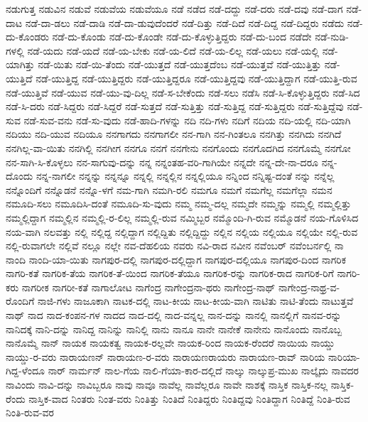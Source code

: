 {ನಡುಗುತ್ತ
ನಡುವಿನ
ನಡುವೆ
ನಡುವೆಯ
ನಡುವೆಯೂ
ನಡೆ
ನಡೆದ
ನಡೆ-ದದ್ದು
ನಡೆ-ದರು
ನಡೆ-ದವು
ನಡೆ-ದಾಗ
ನಡೆ-ದಾಟ
ನಡೆ-ದಾ-ಡಲು
ನಡೆ-ದಾಡಿ
ನಡೆ-ದಾ-ಡುವುದೆಂದರೆ
ನಡೆ-ದಿತ್ತು
ನಡೆ-ದಿದೆ
ನಡೆ-ದಿದ್ದ
ನಡೆ-ದಿದ್ದರು
ನಡೆದು
ನಡೆ-ದು-ಕೊಂಡರು
ನಡೆ-ದು-ಕೊಂಡು
ನಡೆ-ದು-ಕೊಂಡೇ
ನಡೆ-ದು-ಕೊಳ್ಳುತ್ತಿದ್ದರು
ನಡೆ-ದು-ಬಂದ
ನಡೆದೇ
ನಡೆ-ನುಡಿ-ಗಳಲ್ಲಿ
ನಡೆ-ಯದು
ನಡೆ-ಯದೆ
ನಡೆ-ಯ-ಬೇಕು
ನಡೆ-ಯ-ಲಿದೆ
ನಡೆ-ಯ-ಲಿಲ್ಲ
ನಡೆ-ಯಲು
ನಡೆ-ಯಲ್ಲಿ
ನಡೆ-ಯಾಗಿತ್ತು
ನಡೆ-ಯಿತು
ನಡೆ-ಯಿ-ತೆಂದು
ನಡೆ-ಯುತ್ತದೆ
ನಡೆ-ಯುತ್ತದೆಂಬ
ನಡೆ-ಯುತ್ತವೆ
ನಡೆ-ಯುತ್ತಿತ್ತು
ನಡೆ-ಯುತ್ತಿದೆ
ನಡೆ-ಯುತ್ತಿದ್ದ
ನಡೆ-ಯುತ್ತಿದ್ದರು
ನಡೆ-ಯುತ್ತಿದ್ದರೂ
ನಡೆ-ಯುತ್ತಿದ್ದವು
ನಡೆ-ಯುತ್ತಿದ್ದಾಗ
ನಡೆ-ಯುತ್ತಿ-ರುವ
ನಡೆ-ಯುತ್ತಿವೆ
ನಡೆ-ಯುವ
ನಡೆ-ಯು-ವು-ದಿಲ್ಲ
ನಡೆ-ಸ-ಬೇಕೆಂದು
ನಡೆ-ಸಲು
ನಡೆಸಿ
ನಡೆ-ಸಿ-ಕೊಳ್ಳುತ್ತಿದ್ದರು
ನಡೆ-ಸಿದ
ನಡೆ-ಸಿ-ದರು
ನಡೆ-ಸಿದ್ದರು
ನಡೆ-ಸಿದ್ದರೆ
ನಡೆ-ಸುತ್ತದೆ
ನಡೆ-ಸುತ್ತಿತ್ತು
ನಡೆ-ಸುತ್ತಿದ್ದ
ನಡೆ-ಸುತ್ತಿದ್ದರು
ನಡೆ-ಸುತ್ತಿದ್ದೆವು
ನಡೆ-ಸುವ
ನಡೆ-ಸುವ-ವನು
ನಡೆ-ಸು-ವುದು
ನಡೆ-ಹಾದಿ-ಗಳನ್ನು
ನದಿ
ನದಿ-ಗಳು
ನದಿಗೆ
ನದಿಯ
ನದಿ-ಯಲ್ಲಿ
ನದಿ-ಯಾಗಿ
ನದಿಯು
ನದಿ-ಯುವ
ನದಿಯೂ
ನನಗಾಗದು
ನನಗಾಗಲೀ
ನನ-ಗಾಗಿ
ನನ-ಗಿಂತಲೂ
ನನಗಿತ್ತು
ನನಗಿದು
ನನಗಿದೆ
ನನಗಿಲ್ಲ-ವಾ-ಯಿತು
ನನಗಿಲ್ಲಿ
ನನಗೀಗ
ನನಗೂ
ನನಗೆ
ನನಗೇನು
ನನಗೊಂದು
ನನಗೊದಗಿದ
ನನಗೊಮ್ಮೆ
ನನಗೋ
ನನ-ಸಾಗಿ-ಸಿ-ಕೊಳ್ಳಲು
ನನ-ಸಾಗುವು-ದನ್ನು
ನನ್ನ
ನನ್ನಂತಹ-ವರಿ-ಗಾಗಿಯೇ
ನನ್ನದೇ
ನನ್ನ-ದೇ-ನಾ-ದರೂ
ನನ್ನ-ದೊಂದು
ನನ್ನ-ನಾಗಲೀ
ನನ್ನನ್ನು
ನನ್ನನ್ನೂ
ನನ್ನಲ್ಲಿ
ನನ್ನಲ್ಲಿನ
ನನ್ನಲ್ಲಿಯೂ
ನನ್ನಿಂದ
ನನ್ನಿಷ್ಟ-ದಂತೆ
ನನ್ನು
ನನ್ನೆಲ್ಲ
ನನ್ನೊಂದಿಗೆ
ನನ್ನೊಡನೆ
ನನ್ನೊ-ಳಗೆ
ನಮ-ಗಾಗಿ
ನಮಗಿ-ರಲಿ
ನಮಗೂ
ನಮಗೆ
ನಮಗೆಲ್ಲ
ನಮಗೆಲ್ಲಾ
ನಮನ
ನಮೂದಿ-ಸಲು
ನಮೂದಿಸಿ-ದಂತೆ
ನಮೂದಿ-ಸು-ವುದು
ನಮ್ಮ
ನಮ್ಮ-ದಲ್ಲ
ನಮ್ಮದೇ
ನಮ್ಮನ್ನು
ನಮ್ಮಲ್ಲಿ
ನಮ್ಮಲ್ಲಿತ್ತು
ನಮ್ಮಲ್ಲಿದ್ದಾಗ
ನಮ್ಮಲ್ಲಿನ
ನಮ್ಮಲ್ಲಿ-ರ-ಲಿಲ್ಲ
ನಮ್ಮಲ್ಲಿ-ರುವ
ನಮ್ಮಿಬ್ಬರ
ನಮ್ಮೊಂದಿ-ಗಿ-ರುವ
ನಮ್ಮೊಡನೆ
ನಯ-ಗೊಳಿಸಿದ
ನಯ-ವಾಗಿ
ನಲವತ್ತು
ನಲ್ಲಿ
ನಲ್ಲಿದ್ದ
ನಲ್ಲಿದ್ದಾಗ
ನಲ್ಲಿದ್ದಿತು
ನಲ್ಲಿದ್ದಿದ್ದು
ನಲ್ಲಿನ
ನಲ್ಲಿಯ
ನಲ್ಲಿಯೂ
ನಲ್ಲಿಯೇ
ನಲ್ಲಿ-ರುವ
ನಲ್ಲಿ-ರುವಾಗಲೇ
ನಲ್ಲಿವೆ
ನಲ್ಲೂ
ನಲ್ಲೇ
ನವ-ದೆಹಲಿಯ
ನವರು
ನವಿ-ರಾದ
ನವೀನ
ನವೆಂಬರ್
ನವೆಂಬರ್ನಲ್ಲಿ
ನಾ
ನಾಂದಿ
ನಾಂದಿ-ಯಾ-ಯಿತು
ನಾಗಪುರ-ದಲ್ಲಿ
ನಾಗಪುರ-ದಲ್ಲಿದ್ದಾಗ
ನಾಗಪುರ-ದಲ್ಲಿಯೂ
ನಾಗಪುರ-ದಿಂದ
ನಾಗರಿಕ
ನಾಗರಿ-ಕತೆ
ನಾಗರಿಕ-ತೆಯ
ನಾಗರಿಕ-ತೆ-ಯಿಂದ
ನಾಗರಿಕ-ತೆಯೂ
ನಾಗರಿಕ-ರನ್ನು
ನಾಗರಿಕ-ರಾದ
ನಾಗರಿಕ-ರಿಗೆ
ನಾಗರಿ-ಕರು
ನಾಗರೀಕ
ನಾಗರೀ-ಕತೆ
ನಾಗಾಲೋಟ
ನಾಗೆಂದ್ರ
ನಾಗೇಂದ್ರನಾ-ಥರು
ನಾಗೇಂದ್ರ-ನಾಥ್
ನಾಗೇಂದ್ರ-ನಾಥ್ರ-ವ-ರೊಂದಿಗೆ
ನಾಜಿ-ಗಳು
ನಾಜೂಕಾಗಿ
ನಾಟಕ-ದಲ್ಲಿ
ನಾಟ-ಕೀಯ
ನಾಟ-ಕೀಯ-ವಾಗಿ
ನಾಟಿತು
ನಾಟಿ-ತೆಂದು
ನಾಟುತ್ತವೆ
ನಾಥ್
ನಾದ
ನಾದ-ಕಂಪನ-ಗಳ
ನಾದದ
ನಾದ-ದಲ್ಲಿ
ನಾದ-ವನ್ನಲ್ಲ
ನಾನ-ದನ್ನು
ನಾನಲ್ಲಿ
ನಾನಲ್ಲಿಗೆ
ನಾನವ-ರನ್ನು
ನಾನಿದಕ್ಕೆ
ನಾನಿ-ದನ್ನು
ನಾನಿದ್ದ
ನಾನಿನ್ನು
ನಾನಿಲ್ಲಿ
ನಾನು
ನಾನೂ
ನಾನೇ
ನಾನೇಕೆ
ನಾನೇನು
ನಾನೊಂದು
ನಾನೊಬ್ಬ
ನಾನೊಮ್ಮೆ
ನಾನ್
ನಾಯಕ
ನಾಯಕತ್ವ
ನಾಯಕ-ರಲ್ಲವೇ
ನಾಯಕ-ರಿಂದ
ನಾಯಕ-ರೆಂದರೆ
ನಾಯಿಯ
ನಾಯ್ಡು
ನಾಯ್ಡು-ರ-ವರು
ನಾರಾಯಣನ್
ನಾರಾಯಣ-ರ-ವರು
ನಾರಾಯಣರಾಯರು
ನಾರಾಯಣ-ರಾವ್
ನಾರಿಯ
ನಾರಿಯಾ-ಗಿದ್ದ-ಳೆಂದೂ
ನಾರ್
ನಾರ್ಮನ್
ನಾಲ-ಗೆಯ
ನಾಲಿ-ಗೆಯಾ-ಕಾರ-ದಲ್ಲಿದೆ
ನಾಲ್ಕು
ನಾಲ್ಕುಪ್ರ-ಮುಖ
ನಾಲ್ಕೈದು
ನಾವದರ
ನಾವಿಂದು
ನಾವಿ-ದನ್ನು
ನಾವಿಬ್ಬರೂ
ನಾವು
ನಾವೂ
ನಾವೆಲ್ಲ
ನಾವೆಲ್ಲರೂ
ನಾವೇ
ನಾಶಕ್ಕೆ
ನಾಸ್ತಿಕ
ನಾಸ್ತಿಕ-ನಲ್ಲ
ನಾಸ್ತಿಕ-ರೆಂದು
ನಾಸ್ತಿಕ-ವಾದ
ನಿಂತರು
ನಿಂತ-ವರು
ನಿಂತಿತ್ತು
ನಿಂತಿದೆ
ನಿಂತಿದ್ದರು
ನಿಂತಿದ್ದವು
ನಿಂತಿದ್ದಾಗ
ನಿಂತಿದ್ದೆ
ನಿಂತಿ-ರುವ
ನಿಂತಿ-ರುವ-ವರ
}
